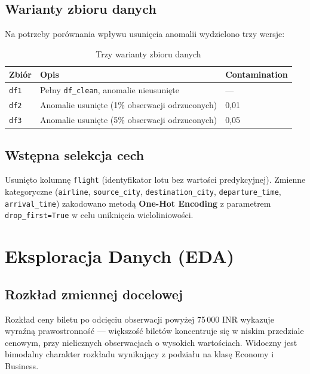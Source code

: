 \documentclass[12pt,a4paper]{article}
\begin{document}
	\subsection{Warianty zbioru danych}
	
	Na potrzeby porównania wpływu usunięcia anomalii wydzielono trzy wersje:
	
	\begin{table}[H]
		\centering
		\begin{tabularx}{0.8\textwidth}{lXl}
			\toprule
			\textbf{Zbiór} & \textbf{Opis} & \textbf{Contamination} \\
			\midrule
			\texttt{df1} & Pełny \texttt{df\_clean}, anomalie nieusunięte & --- \\
			\texttt{df2} & Anomalie usunięte (1\% obserwacji odrzuconych) & 0,01 \\
			\texttt{df3} & Anomalie usunięte (5\% obserwacji odrzuconych) & 0,05 \\
			\bottomrule
		\end{tabularx}
		\caption{Trzy warianty zbioru danych}
	\end{table}
	
	\subsection{Wstępna selekcja cech}
	
	Usunięto kolumnę \texttt{flight} (identyfikator lotu bez wartości predykcyjnej).
	Zmienne kategoryczne (\texttt{airline}, \texttt{source\_city},
	\texttt{destination\_city}, \texttt{departure\_time}, \texttt{arrival\_time})
	zakodowano metodą \textbf{One-Hot Encoding} z parametrem \texttt{drop\_first=True}
	w celu uniknięcia wieloliniowości.
	
	\section{Eksploracja Danych (EDA)}
	
	\subsection{Rozkład zmiennej docelowej}
	
	Rozkład ceny biletu po odcięciu obserwacji powyżej 75\,000 INR wykazuje wyraźną
	prawostronność --- większość biletów koncentruje się w niskim przedziale
	cenowym, przy nielicznych obserwacjach o wysokich wartościach. Widoczny jest
	bimodalny charakter rozkładu wynikający z podziału na klasę Economy i Business.
	
\end{document}
